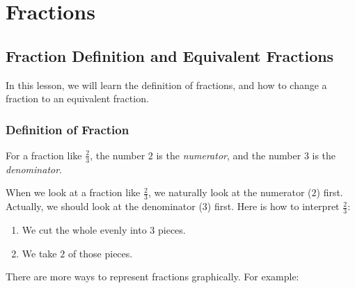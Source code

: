 
\chapter{Fractions}
\section{Fraction Definition and Equivalent Fractions}
\thispagestyle{fancy}

In this lesson, we will learn the definition of fractions, and how to change a fraction to an equivalent fraction.

\subsection{Definition of Fraction}

For a fraction like $\frac{2}{3}$, the number $2$ is the \textit{numerator}, and the number $3$ is the \textit{denominator}.

When we look at a fraction like $\frac{2}{3}$, we naturally look at the numerator ($2$) first. Actually, we should look at the denominator ($3$) first. Here is how to interpret $\frac{2}{3}$:

\begin{enumerate}
\item We cut the whole evenly into $3$ pieces.
\item We take $2$ of those pieces.
\end{enumerate}

\begin{center}
\end{center}

There are more ways to represent fractions graphically. For example:

\begin{center}
\end{center}

